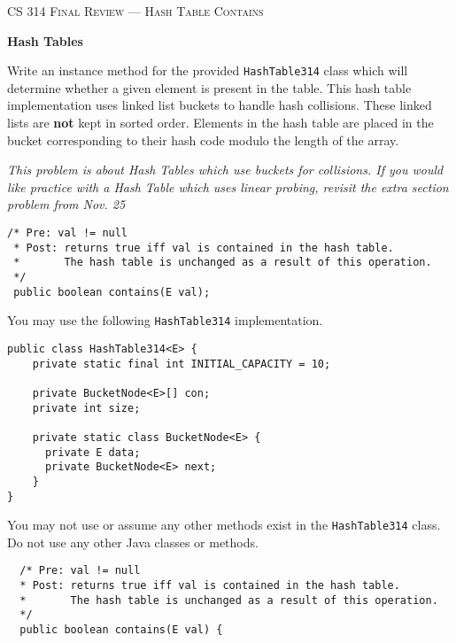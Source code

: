 \documentclass[12pt,letter]{article}
\begin{document}
\noindent\textsc{\large CS 314 Final Review --- Hash Table Contains}

\vspace{6pt}
\noindent\textbf{Hash Tables}

\vspace{2pt}
\noindent Write an instance method for the provided \texttt{HashTable314} class which will determine whether a given element is present in the table.
This hash table implementation uses linked list buckets to handle hash collisions. These linked lists are \textbf{not} kept in sorted order.
Elements in the hash table are placed in the bucket corresponding to their hash code modulo the length of the array.

\vspace{4pt}
\noindent \emph{This problem is about Hash Tables which use buckets for collisions. If you would like practice with a Hash Table which uses linear probing, 
revisit the extra section problem from Nov. 25}

\vspace{4pt}

\begin{verbatim}
/* Pre: val != null
 * Post: returns true iff val is contained in the hash table.
 *       The hash table is unchanged as a result of this operation.
 */
 public boolean contains(E val);
\end{verbatim}

\vspace{6pt}
\noindent You may use the following \texttt{HashTable314} implementation.
\begin{verbatim}
public class HashTable314<E> {
    private static final int INITIAL_CAPACITY = 10;

    private BucketNode<E>[] con;
    private int size;

    private static class BucketNode<E> {
      private E data;
      private BucketNode<E> next;
    }
}
\end{verbatim}

\noindent You may not use or assume any other methods exist in the \texttt{HashTable314} class.
\noindent Do not use any other Java classes or methods.

\clearpage
\begin{verbatim}
  /* Pre: val != null
  * Post: returns true iff val is contained in the hash table.
  *       The hash table is unchanged as a result of this operation.
  */
  public boolean contains(E val) {
\end{verbatim}
\end{document}
